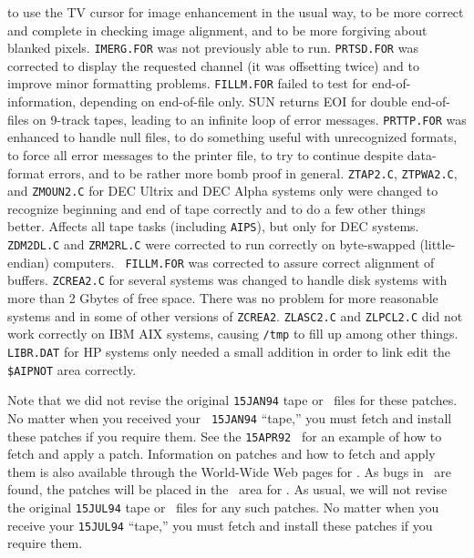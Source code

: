 \begin{description}
    to use the TV cursor for image enhancement in the usual way, to be
    more correct and complete in checking image alignment, and to be
    more forgiving about blanked pixels.
 {\tt IMERG.FOR} was not previously able to run.
 {\tt PRTSD.FOR} was corrected to display the requested
    channel (it was offsetting twice) and to improve minor formatting
    problems.
 {\tt FILLM.FOR} failed to test for end-of-information,
    depending on end-of-file only.  SUN returns EOI for double
    end-of-files on 9-track tapes, leading to an infinite loop of
    error messages.
 {\tt PRTTP.FOR} was enhanced to handle null files, to
    do something useful with unrecognized formats, to force all error
    messages to the printer file, to try to continue despite
    data-format errors, and to be rather more bomb proof in general.
 {\tt ZTAP2.C}, {\tt ZTPWA2.C}, and {\tt ZMOUN2.C} for
   DEC Ultrix and DEC Alpha systems only were changed to recognize
   beginning and end of tape correctly and to do a few other things
   better.  Affects all tape tasks (including {\tt AIPS}), but only
   for DEC systems.
 {\tt ZDM2DL.C} and {\tt ZRM2RL.C} were corrected to
   run correctly on byte-swapped (little-endian) computers.  {\tt
   FILLM.FOR} was corrected to assure correct alignment of buffers.
 {\tt ZCREA2.C} for several systems was changed
    to handle disk systems with more than 2 Gbytes of free space.
    There was no problem for more reasonable systems and in some of
    other versions of \hbox{{\tt ZCREA2}}.
 {\tt ZLASC2.C} and {\tt ZLPCL2.C} did not work
    correctly on IBM AIX systems, causing {\tt /tmp} to fill up among
    other things.
 {\tt LIBR.DAT} for HP systems only needed a small
    addition in order to link edit the {\tt \$AIPNOT} area correctly.
\end{description}
\vspace{-8pt}
Note that we did not revise the original {\tt 15JAN94} tape or \tar\
files for these patches.  No matter when you received your {\tt
15JAN94} ``tape,'' you must fetch and install these patches if you
require them.  See the {\tt 15APR92} \AIPSLETTER\ for an example of
how to fetch and apply a patch.  Information on patches and how to
fetch and apply them is also available through the World-Wide Web
pages for \AIPS.
As bugs in \RELEASENAME\ are found, the patches will be placed in the
\ftp\ area for \hbox{{\RELEASENAME}}.  As usual, we will not revise
the original {\tt 15JUL94} tape or \tar\ files for any such patches.  No
matter when you receive your {\tt 15JUL94} ``tape,'' you must fetch
and install these patches if you require them.

